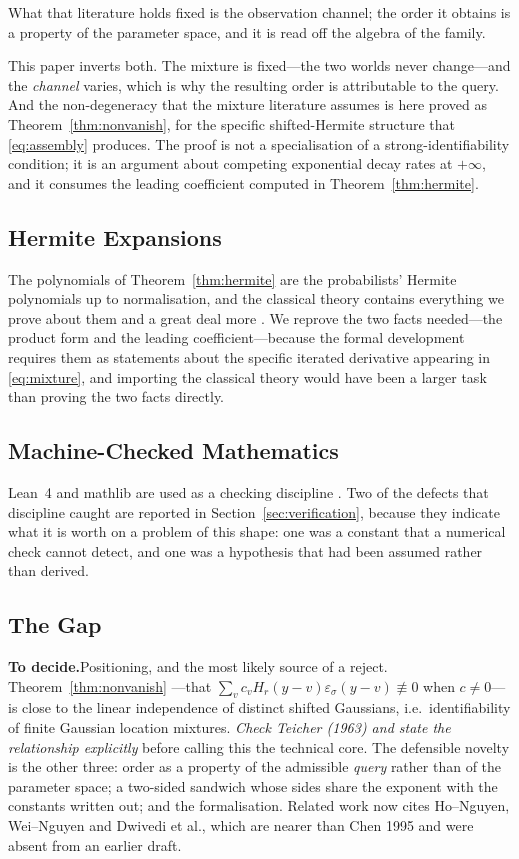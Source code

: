 \documentclass[conference]{IEEEtran}
\theoremstyle{definition}
\newif\ifshownotes\shownotestrue
\newcommand{\TODOPAR}[1]{\ifshownotes\par\vspace{2pt}\noindent%
  {\color{todocol}\textsf{\footnotesize\textbf{To decide.}\;#1}}\par\vspace{2pt}\fi}
\begin{document}
What that literature holds fixed is the observation channel; the order it obtains is a
property of the parameter space, and it is read off the algebra of the family.

This paper inverts both. The mixture is fixed---the two worlds never change---and the
\emph{channel} varies, which is why the resulting order is attributable to the query. And
the non-degeneracy that the mixture literature assumes is here proved as
Theorem~\ref{thm:nonvanish}, for the specific shifted-Hermite structure that
\eqref{eq:assembly} produces. The proof is not a specialisation of a strong-identifiability
condition; it is an argument about competing exponential decay rates at $+\infty$, and it
consumes the leading coefficient computed in Theorem~\ref{thm:hermite}.

\subsection{Hermite Expansions}

The polynomials of Theorem~\ref{thm:hermite} are the probabilists' Hermite polynomials up to
normalisation, and the classical theory contains everything we prove about them and a great
deal more \cite{szego1939}. We reprove the two facts needed---the product form and the
leading coefficient---because the formal development requires them as statements about the
specific iterated derivative appearing in \eqref{eq:mixture}, and importing the classical
theory would have been a larger task than proving the two facts directly.

\subsection{Machine-Checked Mathematics}

Lean~4 and mathlib are used as a checking discipline \cite{demoura2021,mathlib2020}. Two of
the defects that discipline caught are reported in Section~\ref{sec:verification}, because
they indicate what it is worth on a problem of this shape: one was a constant that a
numerical check cannot detect, and one was a hypothesis that had been assumed rather than
derived.

\subsection{The Gap}
\TODOPAR{Positioning, and the most likely source of a reject. Theorem~\ref{thm:nonvanish}
---that $\sum_{v}c_{v}H_{r}(y-v)\varepsilon_{\sigma}(y-v)\not\equiv0$ when $c\neq0$---is close
to the linear independence of distinct shifted Gaussians, i.e.\ identifiability of finite
Gaussian location mixtures. \emph{Check Teicher (1963) and state the relationship explicitly}
before calling this the technical core. The defensible novelty is the other three: order as a
property of the admissible \emph{query} rather than of the parameter space; a two-sided
sandwich whose sides share the exponent with the constants written out; and the
formalisation. Related work now cites Ho--Nguyen, Wei--Nguyen and Dwivedi et al., which are
nearer than Chen 1995 and were absent from an earlier draft.}
\end{document}
